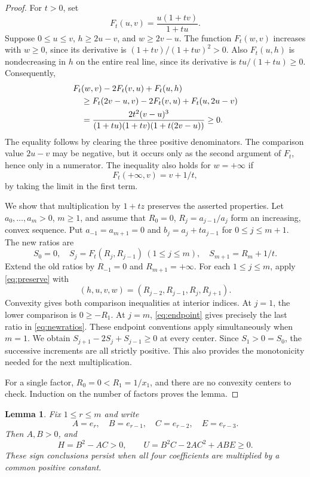 \documentclass[11pt,a4paper]{article}
\newtheorem{lemma}[theorem]{Lemma}
\theoremstyle{remark}
\begin{document}
\begin{proof}
For $t>0$, set
\[
 F_t(u,v)=\frac{u(1+tv)}{1+tu}.
\]
Suppose $0\leq u\leq v$, $h\geq2u-v$, and $w\geq2v-u$.
The function $F_t(w,v)$ increases with $w\geq0$, since its derivative
is $(1+tv)/(1+tw)^2>0$. Also $F_t(u,h)$ is nondecreasing in $h$ on
the entire real line, since its derivative is $tu/(1+tu)\geq0$.
Consequently,
\begin{align}
 &F_t(w,v)-2F_t(v,u)+F_t(u,h)\notag\\
 &\quad\geq F_t(2v-u,v)-2F_t(v,u)+F_t(u,2u-v)\notag\\
 &\quad=\frac{2t^2(v-u)^3}
 {(1+tu)(1+tv)(1+t(2v-u))}\geq0.\label{eq:preserve}
\end{align}
The equality follows by clearing the three positive denominators.
The comparison value $2u-v$ may be negative, but it occurs only as
the second argument of $F_t$, hence only in a numerator. The inequality
also holds for $w=+\infty$ if
\begin{equation}\label{eq:endpoint}
 F_t(+\infty,v)=v+1/t,
\end{equation}
by taking the limit in the first term.

We show that multiplication by $1+tz$ preserves the asserted properties.
Let $a_0,\ldots,a_m>0$, $m\geq1$, and assume that
$R_0=0$, $R_j=a_{j-1}/a_j$ form an increasing, convex sequence.
Put $a_{-1}=a_{m+1}=0$ and
$b_j=a_j+ta_{j-1}$ for $0\leq j\leq m+1$.
The new ratios are
\begin{equation}\label{eq:newratios}
 S_0=0,\quad
 S_j=F_t(R_j,R_{j-1})\ (1\leq j\leq m),\quad
 S_{m+1}=R_m+1/t.
\end{equation}
Extend the old ratios by $R_{-1}=0$ and $R_{m+1}=+\infty$.
For each $1\leq j\leq m$, apply \eqref{eq:preserve} with
\[
 (h,u,v,w)=(R_{j-2},R_{j-1},R_j,R_{j+1}).
\]
Convexity gives both comparison inequalities at interior indices.
At $j=1$, the lower comparison is $0\geq-R_1$.
At $j=m$, \eqref{eq:endpoint} gives precisely the last ratio in
\eqref{eq:newratios}. These endpoint conventions apply simultaneously
when $m=1$. We obtain $S_{j+1}-2S_j+S_{j-1}\geq0$ at every center.
Since $S_1>0=S_0$, the successive increments are all strictly positive.
This also provides the monotonicity needed for the next multiplication.

For a single factor, $R_0=0<R_1=1/x_1$, and there are no convexity
centers to check. Induction on the number of factors proves the lemma.
\end{proof}

\begin{lemma}\label{lem:HU}
Fix $1\leq r\leq m$ and write
\[
 A=e_r,\quad B=e_{r-1},\quad C=e_{r-2},\quad E=e_{r-3}.
\]
Then $A,B>0$, and
\begin{equation}\label{eq:HU}
 H=B^2-AC>0,\qquad U=B^2C-2AC^2+ABE\geq0.
\end{equation}
These sign conclusions persist when all four coefficients are multiplied
by a common positive constant.
\end{lemma}
\end{document}
